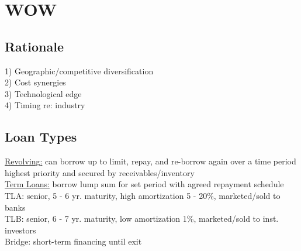 \section{WOW}
	\subsection*{Rationale}
	1) Geographic/competitive diversification\\
	2) Cost synergies\\
	3) Technological edge\\
	4) Timing re: industry\\
	
	\subsection*{Loan Types}
	\underline{Revolving:} can borrow up to limit, repay, and re-borrow again over a time period\\
	highest priority and secured by receivables/inventory\\
	\underline{Term Loans:} borrow lump sum for set period with agreed repayment schedule\\
	TLA: senior, 5 - 6 yr. maturity, high amortization 5 - 20\%, marketed/sold to banks\\
	TLB: senior, 6 - 7 yr. maturity, low amortization 1\%, marketed/sold to inst. investors\\
	Bridge: short-term financing until exit
	